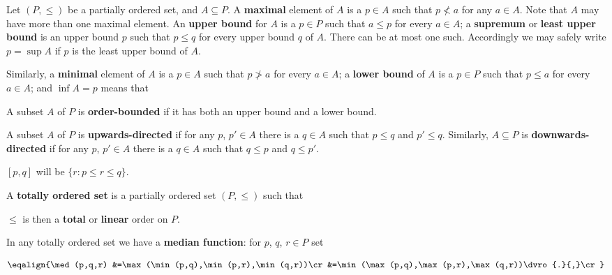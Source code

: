  Let $(P,\le)$ be a partially ordered set, and 
$A\subseteq P$.   A {\bf maximal} element of $A$ 
is a $p\in A$ such that $p\not<a$ for any $a\in A$.   Note that $A$ may 
have more than one maximal element.  An {\bf upper bound} for $A$ is a 
$p\in P$ such that $a\le p$ for every $a\in A$;  a {\bf supremum} or 
{\bf least upper bound} is an upper bound $p$ such that $p\le q$ for 
every upper bound $q$ of $A$.   There can be at most one 
such. 
Accordingly we may safely write $p=\sup A$ if $p$ is the least upper 
bound of $A$. 
      
Similarly, a {\bf minimal} element of $A$ is a $p\in A$ such that 
$p\not>a$ for every $a\in A$;  a {\bf lower bound} of $A$ is a $p\in P$ 
such that $p\le a$ for every $a\in A$;  and 
$\inf A=p$ means that 
      
      
A subset $A$ of $P$ is {\bf order-bounded} if it has both an upper bound 
and a lower bound. 
      
A subset $A$ of $P$ is {\bf upwards-directed} if for any $p$, $p'\in A$ 
there is a $q\in A$ such that $p\le q$ and $p'\le q$. 
Similarly, $A\subseteq P$ is {\bf downwards-directed} if for any $p$, 
$p'\in A$ there is a $q\in A$ such that $q\le p$ and $q\le p'$. 
      
  $[p,q]$ will be 
$\{r:p\le r\le q\}$. 
 
      
 A {\bf totally ordered set} is a partially 
ordered set $(P,\le)$ such that 
      
      
\noindent $\le$ is then a {\bf total} or {\bf linear} order on $P$.    
 
In any 
totally ordered set we have a {\bf median function}:  for $p$, $q$,  
$r\in P$ set  
 
$$\eqalign{\med(p,q,r) 
&=\max(\min(p,q),\min(p,r),\min(q,r))\cr 
&=\min(\max(p,q),\max(p,r),\max(q,r))\dvro{.}{,}\cr}$$ 
 
